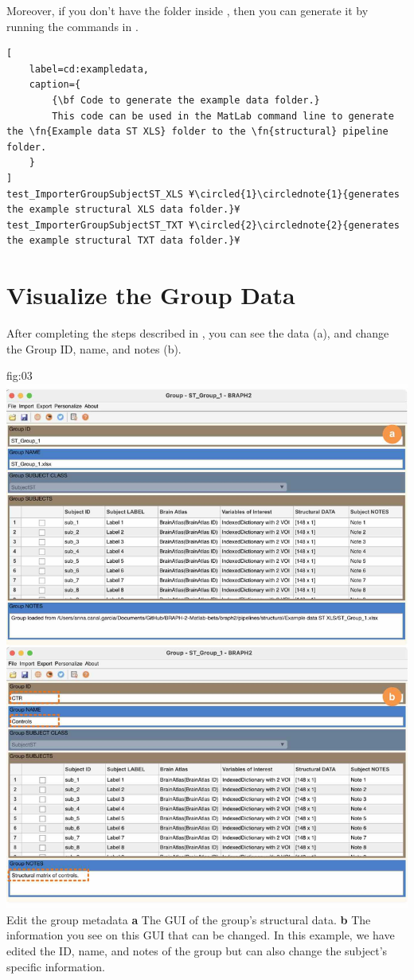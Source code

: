\documentclass[justified]{tufte-handout}
\begin{document}
Moreover, if you don't have the  folder inside , then you can generate it by running the commands in .

\begin{lstlisting}[
	label=cd:exampledata,
	caption={
		{\bf Code to generate the example data folder.}
		This code can be used in the MatLab command line to generate the \fn{Example data ST XLS} folder to the \fn{structural} pipeline folder.
	}
]
test_ImporterGroupSubjectST_XLS ¥\circled{1}\circlednote{1}{generates the example structural XLS data folder.}¥
test_ImporterGroupSubjectST_TXT ¥\circled{2}\circlednote{2}{generates the example structural TXT data folder.}¥
\end{lstlisting}

\section{Visualize the Group Data}

After completing the steps described in , you can see the data (a), and change the Group ID, name, and notes (b). 

	{fig:03}
	{
	\includegraphics{fig03.jpg}
	}
	{Edit the group metadata}
	{ 
	{\bf a} The GUI of the group's structural data. 
	{\bf b} The information you see on this GUI that can be changed. In this example, we have edited the ID, name, and notes of the group but can also change the subject's specific information.
	}
\end{document}
